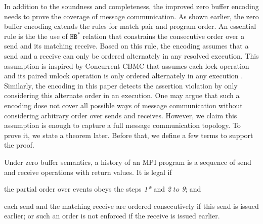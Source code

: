 
In addition to the soundness and completeness, the improved zero buffer encoding needs to prove the coverage of message communication. As shown earlier, the zero buffer encoding extends the rules for match pair and program order. An essential rule is the the use of $\mathtt{HB^*}$ relation that constrains the consecutive order over a send and its matching receive. Based on this rule, the encoding assumes that a send and a receive can only be ordered alternately in any resolved execution. This assumption is inspired by Concurrent CBMC that assumes each lock operation and its paired unlock  operation is only ordered alternately in any execution \cite{DBLP:conf/cav/RabinovitzG05}. Similarly, the encoding in this paper detects the assertion violation by only considering this alternate order in an execution. One may argue that such a encoding dose not cover all possible ways of message communication without considering arbitrary order over sends and receives. However, we claim this assumption is enough to capture a full message communication topology. To prove it, we state a theorem later.  Before that, we define a few terms to support the proof.

\begin{definition}\label{def:legal}
Under zero buffer semantics, a history of an MPI program is a sequence of send and receive operations with return values. It is legal if
\begin{compactenum}
\item the partial order over events obeys the steps \textit{1*} and \textit{2} $to$ \textit{9}; and 
\item each send and the matching receive are ordered consecutively if this send is issued earlier; or such an order is not enforced if the receive is issued earlier.
\end{compactenum}
\end{definition}

